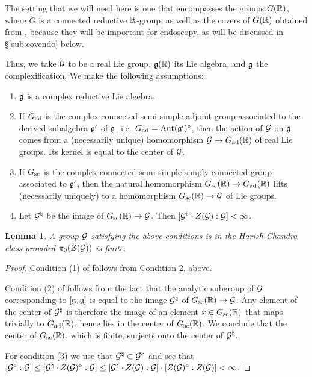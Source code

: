\documentclass{article}
\newtheorem{lem}[thm]{Lemma}
\theoremstyle{definition}
\numberwithin{equation}{section}
\renewcommand{\-}{\hyp{}}
\begin{document}
The setting that we will need here is one that encompasses the groups $G(\mathbb{R})$, where $G$ is a connected reductive $\mathbb{R}$-group, as well as the covers of $G(\mathbb{R})$ obtained from \cite{KalHDC}, because they will be important for endoscopy, as will be discussed in \S\ref{sub:covendo} below.

Thus, we take $\mathcal{G}$ to be a real Lie group, $\mathfrak{g}(\mathbb{R})$ its Lie algebra, and $\mathfrak{g}$ the complexification. We make the following assumptions:
\begin{enumerate}
	\item $\mathfrak{g}$ is a complex reductive Lie algebra.
 	\item If $G_{\textrm{ad}}$ is the complex connected semi-simple adjoint group associated to the derived subalgebra $\mathfrak{g}'$ of $\mathfrak{g}$, i.e. $G_{\textrm{ad}}=\textrm{Aut}(\mathfrak{g}')^\circ$, then the action of $\mathcal{G}$ on $\mathfrak{g}$ comes from a (necessarily unique) homomorphism $\mathcal{G} \to G_{\textrm{ad}}(\mathbb{R})$ of real Lie groups. Its kernel is equal to the center of $\mathcal{G}$.
  	\item If $G_{\textrm{sc}}$ is the complex connected semi-simple simply connected group associated to $\mathfrak{g}'$, then the natural homomorphism $G_{\textrm{sc}}(\mathbb{R}) \to G_{\textrm{ad}}(\mathbb{R})$ lifts (necessarily uniquely) to a homomorphism $G_{\textrm{sc}}(\mathbb{R}) \to \mathcal{G}$ of Lie groups.
   	\item Let $\mathcal{G}^\natural$ be the image of $G_{\textrm{sc}}(\mathbb{R}) \to \mathcal{G}$. Then $[\mathcal{G}^\natural \cdot Z(\mathcal{G}):\mathcal{G}] < \infty$.
\end{enumerate}

\begin{lem} A group $\mathcal{G}$ satisfying the above conditions is in the Harish-Chandra class provided $\pi_0(Z(\mathcal{G}))$ is finite.
\end{lem}
\begin{proof}
	Condition (1) of \cite[\S3]{HC-R1} follows from Condition 2. above.
	
	Condition (2) of \cite[\S3]{HC-R1} follows from the fact that the analytic subgroup of $\mathcal{G}$ corresponding to $[\mathfrak{g},\mathfrak{g}]$ is equal to the image $\mathcal{G}^\natural$ of $G_{\textrm{sc}}(\mathbb{R}) \to \mathcal{G}$. Any element of the center of $\mathcal{G}^\natural$ is therefore the image of an element $x \in G_{\textrm{sc}}(\mathbb{R})$ that maps trivially to $G_{\textrm{ad}}(\mathbb{R})$, hence lies in the center of $G_{\textrm{sc}}(\mathbb{R})$. We conclude that the center of $G_{\textrm{sc}}(\mathbb{R})$, which is finite, surjects onto the center of $\mathcal{G}^\natural$.

	For condition (3) we use that $\mathcal{G}^\natural \subset \mathcal{G}^\circ$ and see that $[\mathcal{G}^\circ : \mathcal{G}] \leq [\mathcal{G}^\natural \cdot Z(\mathcal{G})^\circ : \mathcal{G}] \leq [\mathcal{G}^\natural \cdot Z(\mathcal{G}) : \mathcal{G}] \cdot [Z(\mathcal{G})^\circ:Z(\mathcal{G})] < \infty$.
\end{proof}
\end{document}
